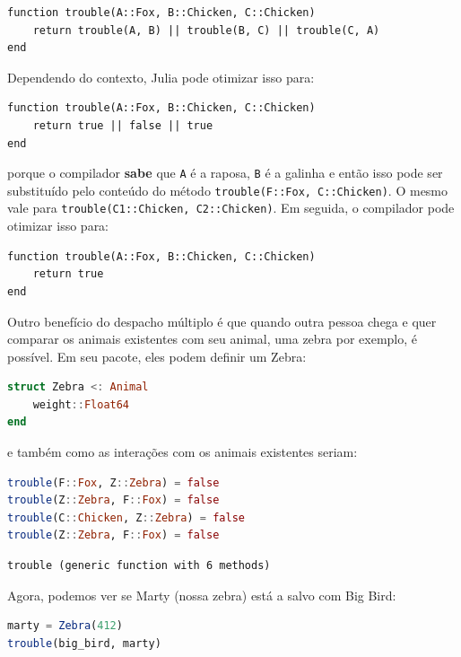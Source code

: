 \documentclass[
  notoc %
]{tufte-book}
\newcommand{\passthrough}[1]{#1}
\begin{document}
\begin{lstlisting}
function trouble(A::Fox, B::Chicken, C::Chicken)
    return trouble(A, B) || trouble(B, C) || trouble(C, A)
end
\end{lstlisting}

Dependendo do contexto, Julia pode otimizar isso para:

\begin{lstlisting}
function trouble(A::Fox, B::Chicken, C::Chicken)
    return true || false || true
end
\end{lstlisting}

porque o compilador \textbf{sabe} que \passthrough{\lstinline!A!} é a
raposa, \passthrough{\lstinline!B!} é a galinha e então isso pode ser
substituído pelo conteúdo do método
\passthrough{\lstinline!trouble(F::Fox, C::Chicken)!}. O mesmo vale para
\passthrough{\lstinline!trouble(C1::Chicken, C2::Chicken)!}. Em seguida,
o compilador pode otimizar isso para:

\begin{lstlisting}
function trouble(A::Fox, B::Chicken, C::Chicken)
    return true
end
\end{lstlisting}

Outro benefício do despacho múltiplo é que quando outra pessoa chega e
quer comparar os animais existentes com seu animal, uma zebra por
exemplo, é possível. Em seu pacote, eles podem definir um Zebra:

\begin{lstlisting}[language=Julia]
struct Zebra <: Animal
    weight::Float64
end
\end{lstlisting}

e também como as interações com os animais existentes seriam:

\begin{lstlisting}[language=Julia]
trouble(F::Fox, Z::Zebra) = false
trouble(Z::Zebra, F::Fox) = false
trouble(C::Chicken, Z::Zebra) = false
trouble(Z::Zebra, F::Fox) = false
\end{lstlisting}

\begin{lstlisting}[language=Output]
trouble (generic function with 6 methods)
\end{lstlisting}

Agora, podemos ver se Marty (nossa zebra) está a salvo com Big Bird:

\begin{lstlisting}[language=Julia]
marty = Zebra(412)
trouble(big_bird, marty)
\end{lstlisting}
\end{document}
